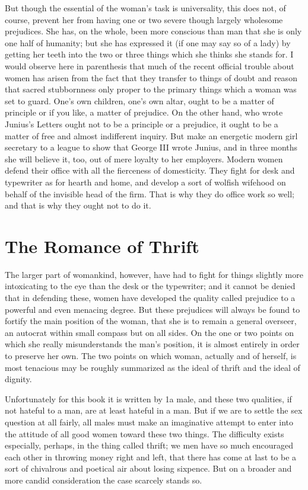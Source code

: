 \documentclass{book}
\begin{document}
But though the essential of the woman’s task is universality, this does not, of course, prevent her from having one or two severe though largely wholesome prejudices. She has, on the whole, been more conscious than man that she is only one half of humanity; but she has expressed it (if one may say so of a lady) by getting her teeth into the two or three things which she thinks she stands for. I would observe here in parenthesis that much of the recent official trouble about women has arisen from the fact that they transfer to things of doubt and reason that sacred stubbornness only proper to the primary things which a woman was set to guard. One’s own children, one’s own altar, ought to be a matter of principle or if you like, a matter of prejudice. On the other hand, who wrote Junius’s Letters ought not to be a principle or a prejudice, it ought to be a matter of free and almost indifferent inquiry. But make an energetic modern girl secretary to a league to show that George III wrote Junius, and in three months she will believe it, too, out of mere loyalty to her employers. Modern women defend their office with all the fierceness of domesticity. They fight for desk and typewriter as for hearth and home, and develop a sort of wolfish wifehood on behalf of the invisible head of the firm. That is why they do office work so well; and that is why they ought not to do it.

\chapter{The Romance of Thrift}
\label{chapter-22}
The larger part of womankind, however, have had to fight for things slightly more intoxicating to the eye than the desk or the typewriter; and it cannot be denied that in defending these, women have developed the quality called prejudice to a powerful and even menacing degree. But these prejudices will always be found to fortify the main position of the woman, that she is to remain a general overseer, an autocrat within small compass but on all sides. On the one or two points on which she really misunderstands the man’s position, it is almost entirely in order to preserve her own. The two points on which woman, actually and of herself, is most tenacious may be roughly summarized as the ideal of thrift and the ideal of dignity.

Unfortunately for this book it is written by 1a male, and these two qualities, if not hateful to a man, are at least hateful in a man. But if we are to settle the sex question at all fairly, all males must make an imaginative attempt to enter into the attitude of all good women toward these two things. The difficulty exists especially, perhaps, in the thing called thrift; we men have so much encouraged each other in throwing money right and left, that there has come at last to be a sort of chivalrous and poetical air about losing sixpence. But on a broader and more candid consideration the case scarcely stands so.
\end{document}

